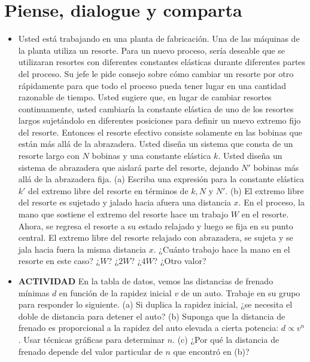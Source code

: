 \documentclass[11pt,a4paper]{article}
\begin{document}
\section*{Piense, dialogue y comparta}

\begin{itemize}
    \item[\textbf{1.}] Usted está trabajando en una planta de fabricación. Una de las máquinas de la planta utiliza un resorte. Para un nuevo proceso, sería deseable que se utilizaran resortes con diferentes constantes elásticas durante diferentes partes del proceso. Su jefe le pide consejo sobre cómo cambiar un resorte por otro rápidamente para que todo el proceso pueda tener lugar en una cantidad razonable de tiempo. Usted sugiere que, en lugar de cambiar resortes continuamente, usted cambiaría la constante elástica de uno de los resortes largos sujetándolo en diferentes posiciones para definir un nuevo extremo fijo del resorte. Entonces el resorte efectivo consiste solamente en las bobinas que están más allá de la abrazadera. Usted diseña un sistema que consta de un resorte largo con $N$ bobinas y una constante elástica $k$. Usted diseña un sistema de abrazadera que aislará parte del resorte, dejando $N'$ bobinas más allá de la abrazadera fija. (a) Escriba una expresión para la constante elástica $k'$ del extremo libre del resorte en términos de $k, N$ y $N'$. (b) El extremo libre del resorte es sujetado y jalado hacia afuera una distancia $x$. En el proceso, la mano que sostiene el extremo del resorte hace un trabajo $W$ en el resorte. Ahora, se regresa el resorte a su estado relajado y luego se fija en su punto central. El extremo libre del resorte relajado con abrazadera, se sujeta y se jala hacia fuera la misma distancia $x$. ¿Cuánto trabajo hace la mano en el resorte en este caso? ¿$W$? ¿$2W$? ¿$4W$? ¿Otro valor?
    \vspace*{9cm}

    \item[\textbf{2.}] \textbf{ACTIVIDAD} En la tabla de datos, vemos las distancias de frenado mínimas $d$ en función de la rapidez inicial $v$ de un auto. Trabaje en su grupo para responder lo siguiente. (a) Si duplica la rapidez inicial, ¿se necesita el doble de distancia para detener el auto? (b) Suponga que la distancia de frenado es proporcional a la rapidez del auto elevada a cierta potencia: $d \propto v^n$. Usar técnicas gráficas para determinar $n$. (c) ¿Por qué la distancia de frenado depende del valor particular de $n$ que encontró en (b)?
    \vspace*{8cm}
\end{itemize}
\end{document}
